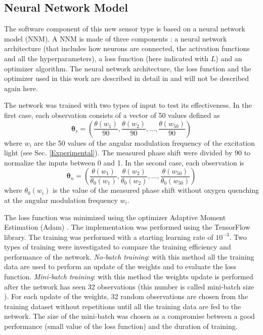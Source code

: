 \documentclass[sensors,article,submit,moreauthors,pdftex,10pt,a4paper]{Definitions/mdpi}
\begin{document}
\subsection{Neural Network Model}
\label{NN}

The software component of this new sensor type is based on a neural network model (NNM). A NNM is made of three components \cite{Michelucci2017}: a neural network architecture (that includes how neurons are connected, the activation functions and all the hyperparameters), a loss function (here indicated with $L$) and an optimizer algorithm. 
The neural network architecture, the loss function and the optimizer used in this work are described in detail in \cite{Michelucci2019_2} and will not be described again here.

The network was trained with two types of input to test its effectiveness. In the first case, each observation consists of a vector of 50 values defined as
\begin{equation}
\label{input1}
{\pmb \theta}_s = \left(
\frac{\theta(w_1)}{90} , \frac{\theta(w_2)}{90} , ..., \frac{\theta(w_{50})}{90} 
\right)
\end{equation}
where $w_i$ are the 50 values of the angular modulation frequency of the excitation light (see Sec. \ref{Experimental}). The measured phase shift were divided by 90 to normalize the inputs between 0 and 1. In the second case, each observation is
\begin{equation}
\label{input2}
{\pmb \theta}_n = \left(
\frac{\theta(w_1)}{\theta_0(w_1)} , \frac{\theta(w_2)}{\theta_0(w_2)} , ..., \frac{\theta(w_{50})}{\theta_0(w_{50})} 
\right)
\end{equation}
where $\theta_0(w_i)$ is the value of the measured phase shift without oxygen quenching at the angular modulation frequency $w_i$.

The loss function was minimized using the optimizer Adaptive Moment Estimation (Adam) \cite{Kingma2014, Michelucci2017}. The implementation was performed using the TensorFlow\texttrademark $\ $library. The training was performed with a starting learning rate of $10^{-3}$. Two types of training were investigated to compare the training efficiency and performance of the network. {\sl No-batch training}: with this method all the training data  are used to perform an update of the weights and to evaluate the loss function. {\sl Mini-batch training}: with this method the weights update is performed after the network has seen 32 observations (this number is called mini-batch size \cite{Michelucci2017}). For each update of the weights, 32 random observations are chosen from the training dataset without repetitions until all the training data are fed to the network. 
The size of the mini-batch was chosen as a compromise between a good performance (small value of the loss function) and the duration of training.
\end{document}
